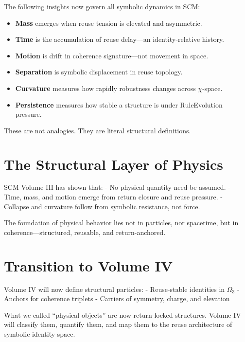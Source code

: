 The following insights now govern all symbolic dynamics in SCM:

\begin{itemize}
    \item \textbf{Mass} emerges when reuse tension is elevated and asymmetric.
    \item \textbf{Time} is the accumulation of reuse delay—an identity-relative history.
    \item \textbf{Motion} is drift in coherence signature—not movement in space.
    \item \textbf{Separation} is symbolic displacement in reuse topology.
    \item \textbf{Curvature} measures how rapidly robustness changes across $\chi$-space.
    \item \textbf{Persistence} measures how stable a structure is under RuleEvolution pressure.
\end{itemize}

These are not analogies. They are literal structural definitions.

\section{The Structural Layer of Physics}

SCM Volume III has shown that:
- No physical quantity need be assumed.
- Time, mass, and motion emerge from return closure and reuse pressure.
- Collapse and curvature follow from symbolic resistance, not force.

The foundation of physical behavior lies not in particles, nor spacetime, but in coherence—structured, reusable, and return-anchored.

\section{Transition to Volume IV}

Volume IV will now define structural particles:
- Reuse-stable identities in $\Omega_3$
- Anchors for coherence triplets
- Carriers of symmetry, charge, and elevation

What we called “physical objects” are now return-locked structures. Volume IV will classify them, quantify them, and map them to the reuse architecture of symbolic identity space.

